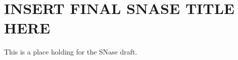 \chapter{INSERT FINAL SNASE TITLE HERE}\label{snase}

This is a place holding for the SNase draft. 
